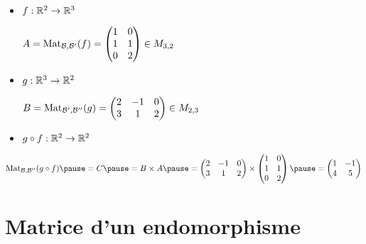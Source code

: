 \begin{frame}
\begin{exemple}

\begin{itemize}
  \item $f : \mathbb{R}^2 \to \mathbb{R}^3$
  
  $A = \mathop{\text{Mat}}\nolimits_{\mathcal{B},\mathcal{B}'} (f)
= \begin{pmatrix}
1&0\cr
1&1\cr
0&2\cr
\end{pmatrix}
\in M_{3,2}$
\pause

  \item $g : \mathbb{R}^3 \to \mathbb{R}^2$ 
  
  $B = \mathop{\text{Mat}}\nolimits_{\mathcal{B}',\mathcal{B}''} (g)
= \begin{pmatrix}
2&-1&0\cr
3&1&2\cr
\end{pmatrix}
\in M_{2,3}$

\pause
  \item 
  
  $g \circ f : \mathbb{R}^2 \to \mathbb{R}^2$
  
\end{itemize}  
\pause
  $$\Mat_{\mathcal{B},\mathcal{B}''} (g \circ f) \pause = C \pause = B \times A 
\pause  = 
\begin{pmatrix}
2&-1&0\cr
3&1&2\cr
\end{pmatrix}
\times
\begin{pmatrix}
1&0\cr
1&1\cr
0&2\cr
\end{pmatrix}
\pause = 
\begin{pmatrix}
1&-1\cr
4&5\cr
\end{pmatrix}
$$
  


\end{exemple}
\end{frame}

\section{Matrice d'un endomorphisme}


